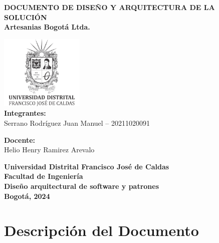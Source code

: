 \documentclass[12pt]{article}
\begin{document}
\begin{titlepage}
    \begin{center}
        
        \textbf{\uppercase{Documento de Diseño y Arquitectura de la solución}}\\
        \textbf{Artesanias Bogotá Ltda.}
        
        \vspace{2cm}
        
        \includegraphics[width=0.3\textwidth]{img/ud.png}\\[1cm]
        
            \textbf{Integrantes:}\\[0.5cm]
            Serrano Rodríguez Juan Manuel – 20211020091\\

        \vspace{2cm}
        
            \textbf{Docente:}\\[0.5cm]
            Helio Henry Ramirez Arevalo
        
        \vfill
        
        \textbf{\large{Universidad Distrital Francisco José de Caldas}}\\
        \textbf{\large{Facultad de Ingeniería}}\\
        \textbf{\large{Diseño arquitectural de software y patrones}}\\
        \textbf{\large{Bogotá, 2024}}\\

        
    \end{center}
\end{titlepage}

\tableofcontents
\newpage

\listoffigures
\newpage

\listoftables
\newpage

\section{Descripción del Documento}
\end{document}
